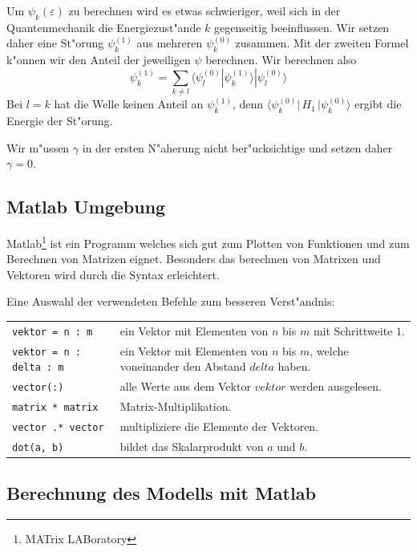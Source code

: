 \begin{refsection}
Um $\psi_k(\varepsilon)$ zu berechnen wird es etwas schwieriger,
weil sich in der Quantenmechanik die Energiezust"ande $k$ gegenseitig beeinflussen.
Wir setzen daher eine St"orung $\psi_k^{(1)}$ aus mehreren $\psi_k^{(0)}$ zusammen.
Mit der zweiten Formel k"onnen wir den Anteil der jeweiligen $\psi$ berechnen.
Wir berechnen also 
\[
\psi_k^{(1)} =
\sum_{k\ne l}
\langle\psi_l^{(0)}|\psi_k^{(1)}\rangle |\psi_l^{(0)}\rangle
\]
Bei $l = k$ hat die Welle keinen Anteil an $\psi_k^{(1)}$,
denn $\langle \psi_k^{(0)}|\, H_1 \,|\psi_k^{(0)}\rangle$ ergibt die Energie der St"orung.

Wir m"ussen $\gamma$ in der ersten N"aherung nicht ber"ucksichtige und setzen daher $\gamma = 0$.




\subsection{Matlab Umgebung}

Matlab\footnote{MATrix LABoratory} ist ein Programm welches sich gut zum Plotten von Funktionen
und zum Berechnen von Matrizen eignet.
Besonders das berechnen von Matrixen und Vektoren wird durch die Syntax erleichtert.

Eine Auswahl der verwendeten Befehle zum besseren Verst"andnis:

\begin{center}
	\begin{tabular}{lp{9cm}}
		\verb|vektor = n : m| & ein Vektor mit Elementen von $n$ bis $m$ mit Schrittweite $1$. \\
		\verb|vektor = n : delta : m| & ein Vektor mit Elementen von $n$ bis $m$, welche voneinander den Abstand $delta$ haben. \\
		\verb|vector(:)| & alle Werte aus dem Vektor $vektor$ werden ausgelesen. \\
		\verb|matrix * matrix| & Matrix-Multiplikation. \\
		\verb|vector .* vector| & multipliziere die Elemente der Vektoren. \\
		\verb|dot(a, b)| & bildet das Skalarprodukt von $a$ und $b$.
	\end{tabular}
\end{center}




\subsection{Berechnung des Modells mit Matlab}


\end{refsection}
